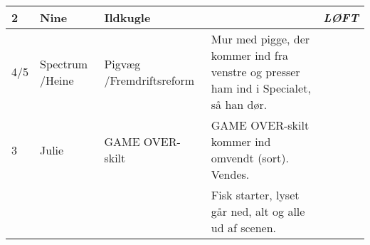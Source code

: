 \documentclass[a4paper,11pt]{article}
\begin{document}
\begin{sketch}
\begin{longtable}{|l||p{2cm}|p{3cm}|p{6.5cm}|p{1.3cm}|}
  2 & Nine & Ildkugle & & \textit{LØFT} \\ \hline

  4/5 & Spectrum /Heine & Pigvæg /Fremdriftsreform & Mur med pigge, der kommer ind fra venstre og presser ham ind i Specialet, så han dør. & \\ \hline

  3 & Julie & GAME OVER-skilt & GAME OVER-skilt kommer ind omvendt (sort). Vendes. & \\ \hline

    & & & Fisk starter, lyset går ned, alt og alle ud af scenen. & \\ \hline

\end{longtable}


\end{sketch}
\end{document}
